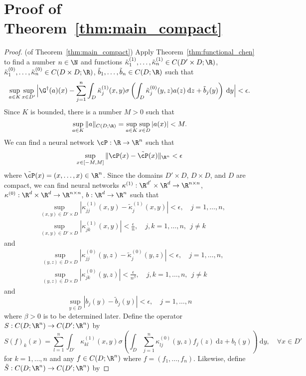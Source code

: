 {\section{Proof of Theorem~\ref{thm:main_compact}}
\begin{proof}(of Theorem~\ref{thm:main_compact})
Apply Theorem~\ref{thm:functional_chen} to find a number \(n \in \N\) and functions \(\tilde{\kappa}^{(1)}_1,\dots,\tilde{\kappa}^{(1)}_n \in C(D' \times D; \R)\), \(\tilde{\kappa}^{(0)}_1,\dots,\tilde{\kappa}^{(0)}_n \in C(D \times D; \R)\), \(\tilde{b}_1,\dots,\tilde{b}_n \in C(D; \R)\) such that
\[\sup_{a \in K} \sup_{x \in D'}\Big| \G^\dagger(a)(x) - \sum_{j=1}^n \int_D \tilde{\kappa}^{(1)}_j(x, y) \sigma \left ( \int_D \tilde{\kappa}^{(0)}_j (y,z) a(z) \: \text{d} z + \tilde{b}_j(y) \right ) \: \text{d} y \Big| < \epsilon. \]
Since \(K\) is bounded, there is a number \(M > 0\) such that
\[\sup_{a \in K} \|a\|_{C(D;\R)} = \sup_{a \in K} \sup_{x \in D} |a(x)| < M.\]
We can find a neural network \(\cP: \R \to \R^n\) such that
\[\sup_{x \in [-M,M]} \|\cP(x) - \tilde{\cP}(x)\|_{\R^n} < \epsilon\]
where \(\tilde{\cP}(x) = (x,\dots,x) \in \R^n\). 
Since the domains \(D' \times D\), \(D \times D\), and \(D\) are compact, we can find neural networks \(\kappa^{(1)}: \R^{d'} \times \R^d \to \R^{n \times n}\), \(\kappa^{(0)}: \R^d \times \R^d \to \R^{n \times n}\), \(b: \R^d \to \R^n\) such that
\begin{align*}
    &\sup_{(x,y) \in D' \times D} |\kappa^{(1)}_{jj}(x,y) - \tilde{\kappa}^{(1)}_j (x,y)| < \epsilon, \quad j=1,\dots,n, \\
    &\sup_{(x,y) \in D' \times D} |\kappa_{jk}^{(1)}(x,y)| < \frac{\epsilon}{n}, \quad j,k=1,\dots,n, \:\: j\neq k
\end{align*}
and 
\begin{align*}
    &\sup_{(y,z) \in D \times D} |\kappa^{(0)}_{jj}(y,z) - \tilde{\kappa}^{(0)}_j (y,z)| < \epsilon, \quad j=1,\dots,n, \\
    &\sup_{(y,z) \in D \times D} |\kappa_{jk}^{(0)}(y,z)| < \frac{\epsilon}{n^\beta}, \quad j,k=1,\dots,n, \:\: j\neq k
\end{align*}
and
\[\sup_{y \in D} |b_j(y) - \tilde{b}_j(y)| < \epsilon, \quad j=1,\dots,n\]
where \(\beta > 0\) is to be determined later. Define the operator \(S: C(D;\R^n) \to C(D';\R^n)\) by
\[S(f)_k(x) = \sum_{l=1}^n \int_{D'} \kappa^{(1)}_{kl}(x,y) \sigma \left ( \int_D \sum_{j=1}^n \kappa^{(0)}_{lj} (y,z) f_j(z) \: \text{d}z + b_l(y) \right ) \: \text{d}y, \quad \forall x \in D' \]
for \(k=1,\dots,n\) and any \(f \in C(D;\R^n)\) where \(f = (f_1,\dots,f_n)\). Likewise, define \(\tilde{S}: C(D;\R^n) \to C(D';\R^n)\) by

\end{proof}}
